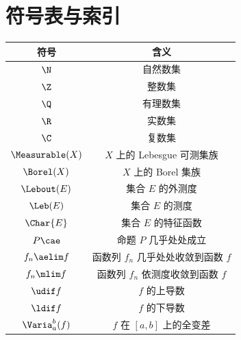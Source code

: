 \section{符号表与索引}
\vspace{\baselineskip}
\begin{center}
    \begin{tabular}{c|c}
        \toprule
        \textbf{符号} & \textbf{含义} \\
        \midrule
        \(\N\) & 自然数集 \\
        \(\Z\) & 整数集 \\
        \(\Q\) & 有理数集 \\
        \(\R\) & 实数集 \\
        \(\C\) & 复数集 \\
        \(\Measurable(X)\) & \(X\) 上的 Lebesgue 可测集族 \\
        \(\Borel(X)\) & \(X\) 上的 Borel 集族 \\
        \(\Lebout(E)\) & 集合 \(E\) 的外测度 \\
        \(\Leb(E)\) & 集合 \(E\) 的测度 \\
        \(\Char{E}\) & 集合 \(E\) 的特征函数 \\
        \(P\cae\) & 命题 \(P\) 几乎处处成立 \\ 
        \(f_n\aelim f\) & 函数列 \(f_n\) 几乎处处收敛到函数 \(f\) \\
        \(f_n\mlim f\) & 函数列 \(f_n\) 依测度收敛到函数 \(f\) \\
        \(\udif f\) & \(f\) 的上导数 \\
        \(\ldif f\) & \(f\) 的下导数 \\
        \(\Varia_a^b(f)\) & \(f\) 在 \([a,b]\) 上的全变差 \\
        \bottomrule
    \end{tabular}
\end{center}